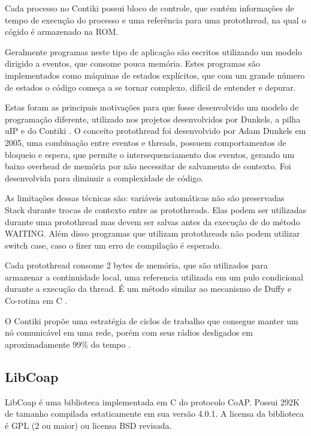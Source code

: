 Cada processo no Contiki possui bloco de controle, que cont\'em informa\-\c{c}\~oes de tempo de execu\c{c}\~ao do processo e uma refer\^encia para uma protothread, na qual o c\'ogido \'e armazenado na ROM. 

Geralmente programas neste tipo de aplica\c{c}\~ao s\~ao escritos utilizando um modelo dirigido a eventos, que consome pouca mem\'oria. Estes programas s\~ao implementados como m\'aquinas de estados expl\'icitos, que com um grande n\'umero de estados o c\'odigo come\c{c}a a se tornar complexo, dif\'icil de entender e depurar.

Estas foram as principais motiva\c{c}\~oes para que fosse desenvolvido um modelo de programa\c{c}\~ao diferente, utilizado nos projetos desenvolvidos por Dunkels, a pilha uIP e do Contiki \cite{Dunkels05protothreads}. O conceito protothread foi desenvolvido por Adam Dunkels em 2005, uma combina\c{c}\~ao entre eventos e threads, possuem comportamentos de bloqueio e espera, que permite o intersequenciamento dos eventos, gerando um baixo overhead de mem\'oria por n\~ao necessitar de salvamento de contexto. Foi desenvolvida para diminuir a complexidade de c\'odigo.

As limita\c{c}\~oes dessas t\'ecnicas s\~ao: vari\'aveis autom\'aticas n\~ao s\~ao preservadas Stack durante trocas de contexto entre as protothreads. Elas podem ser utilizadas durante uma protothread mas devem ser salvas antes da execu\c{c}\~ao de do m\'etodo WAITING. Al\'em disso programas que utilizam protothreads n\~ao podem utilizar switch case, caso o fizer um erro de compila\c{c}\~ao \'e esperado.

Cada protothread consome 2 bytes de mem\'oria, que s\~ao utilizados para armazenar a continuidade local, uma referencia utilizada em um pulo condicional durante a execu\c{c}\~ao da thread. \'E um m\'etodo similar ao mecanismo de Duffy e Co-rotina em C \cite{duffyMechanism}.

O Contiki prop\~oe uma estrat\'egia de ciclos de trabalho que consegue manter um n\'o comunic\'avel em uma rede, por\'em com seus r\'adios desligados em aproximadamente 99\% do tempo \cite{Dunkels11thecontikimac}.

\subsection{LibCoap}
LibCoap \'e uma biblioteca implementada em C do protocolo CoAP. Possui 292K de tamanho compilada estaticamente em sua vers\~ao 4.0.1.
A licensa da biblioteca \'e GPL (2 ou maior) ou licensa BSD revisada.

